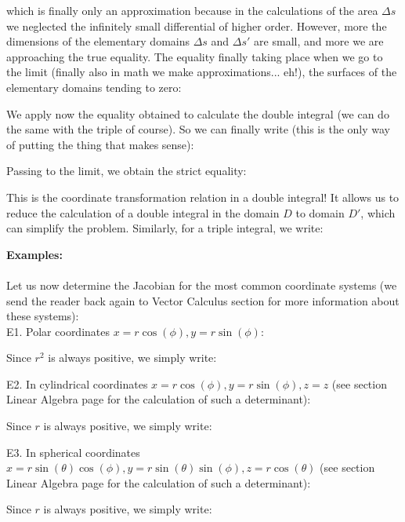 	which is finally only an approximation because in the calculations of the area $\Delta s$ we neglected the infinitely small differential of higher order. However, more the dimensions of the elementary domains $\Delta s$ and $\Delta s'$ are small, and more we are approaching the true equality. The equality finally taking place when we go to the limit (finally also in math we make approximations... eh!), the surfaces of the elementary domains tending to zero:
	
	We apply now the equality obtained to calculate the double integral (we can do the same with the triple of course). So we can finally write (this is the only way of putting the thing that makes sense):
	
	Passing to the limit, we obtain the strict equality:
	
	This is the coordinate transformation relation in a double integral! It allows us to reduce the calculation of a double integral in the domain $D$ to domain $D'$, which can simplify the problem.
	Similarly, for a triple integral, we write:
	
	
	\begin{tcolorbox}[colframe=black,colback=white,sharp corners]
	\textbf{{\Large {}}Examples:}\\\\
	Let us now determine the Jacobian for the most common coordinate systems (we send the reader back again to Vector Calculus section for more information about these systems):\\
	
	E1. Polar coordinates\label{jacobian in polar coordinates} $x=r\cos(\phi),y=r\sin(\phi)$:
	
	Since $r^2$ is always positive, we simply write:
	
	\end{tcolorbox}
	
	\pagebreak
	\begin{tcolorbox}[colframe=black,colback=white,sharp corners]
	E2. In cylindrical coordinates $x=r\cos(\phi),y=r\sin(\phi),z=z$ (see section Linear Algebra  page \pageref{determinant} for the calculation of such a determinant):
	
	Since $r$ is always positive, we simply write:
	
	
	E3. \label{jacobian spherical coordinates}In spherical coordinates $x=r\sin(\theta)\cos(\phi),y=r\sin(\theta)\sin(\phi),z=r\cos(\theta)$ (see section Linear Algebra page \pageref{determinant} for the calculation of such a determinant):
	
	Since $r$ is always positive, we simply write:
	
	\end{tcolorbox}
	
